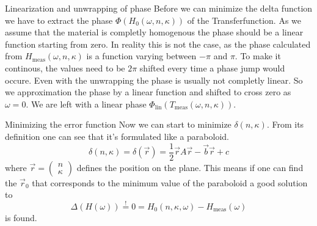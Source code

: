 \documentclass[aspectratio=1610, 9pt]{beamer}
\begin{document}
\begin{frame}{Linearization and unwrapping of phase}
  Before we can minimize the delta function we have to extract the phase $\Phi(H_0(\omega, n, \kappa))$ of the Transferfunction.
  As we assume that the material is completly homogenous the phase should be a linear function starting from zero.
  In reality this is not the case, as the phase calculated from $H_\text{meas}(\omega, n, \kappa)$ is a function varying between $-\pi$ and $\pi$.
  To make it continous, the values need to be $2\pi$ shifted every time a phase jump would occure.
  Even with the unwrapping the phase is usually not completly linear.
  So we approximation the phase by a linear function and shifted to cross zero as $\omega=0$.
  We are left with a linear phase $\Phi_\text{lin}(T_\text{meas}(\omega, n, \kappa))$.
\end{frame}

\begin{frame}{Minimizing the error function}
  Now we can start to minimize $\delta(n, \kappa)$.
  From its definition one can see that it's formulated like a paraboloid.
  \begin{equation}
    \delta(n, \kappa) = \delta(\vec{r}) = \frac{1}{2} \vec{r} A\vec{r} - \vec{b} \vec{r} + c
  \end{equation}
  where $\vec{r} = \begin{pmatrix} n\\ \kappa \end{pmatrix}$ defines the position on the plane.
  This means if one can find the $\vec{r}_0$ that corresponds to the minimum value of the paraboloid a good solution to
  \begin{equation}
    \Delta(H(\omega)) \overset{!}{=} 0 = H_0(n, \kappa, \omega) - H_\text{meas}(\omega)
  \end{equation}
  is found.
\end{frame}
\end{document}
